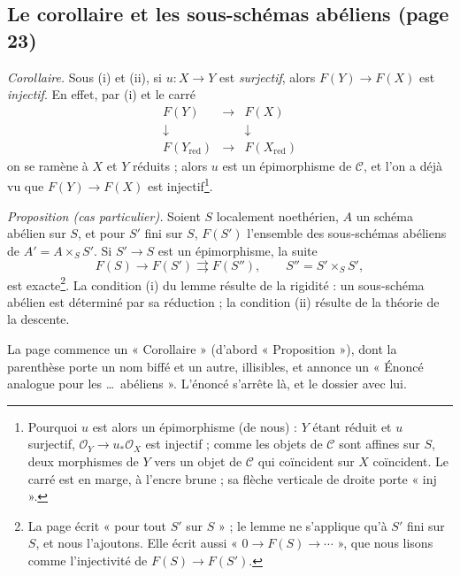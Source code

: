 \documentclass[11pt,a4paper]{article}
\begin{document}
\subsection*{Le corollaire et les sous-schémas abéliens (page 23)}

\emph{Corollaire.} Sous (i) et (ii), si $u \colon X \to Y$ est
\emph{surjectif}, alors $F(Y) \to F(X)$ est \emph{injectif}. En effet, par (i)
et le carré
\[
  \begin{array}{ccc}
    F(Y) & \longrightarrow & F(X) \\
    \downarrow & & \downarrow \\
    F(Y_{\mathrm{red}}) & \longrightarrow & F(X_{\mathrm{red}})
  \end{array}
\]
on se ramène à $X$ et $Y$ réduits ; alors $u$ est un épimorphisme de
$\mathcal{C}$, et l'on a déjà vu que $F(Y) \to F(X)$ est
injectif\footnote{Pourquoi $u$ est alors un épimorphisme (de nous) : $Y$ étant
réduit et $u$ surjectif, $\mathcal{O}_Y \to u_*\mathcal{O}_X$ est injectif ;
comme les objets de $\mathcal{C}$ sont affines sur $S$, deux morphismes de $Y$
vers un objet de $\mathcal{C}$ qui coïncident sur $X$ coïncident. Le carré est
en marge, à l'encre brune ; sa flèche verticale de droite porte « inj ».}.

\emph{Proposition (cas particulier).} Soient $S$ localement noethérien, $A$ un
schéma abélien sur $S$, et pour $S'$ fini sur $S$, $F(S')$ l'ensemble des
sous-schémas abéliens de $A' = A \times_S S'$. Si $S' \to S$ est un
épimorphisme, la suite
\[
  F(S) \to F(S') \rightrightarrows F(S'') , \qquad S'' = S' \times_S S' ,
\]
est exacte\footnote{La page écrit « pour tout $S'$ sur $S$ » ; le lemme ne s'applique qu'à
$S'$ fini sur $S$, et nous l'ajoutons. Elle écrit aussi
« $0 \to F(S) \to \cdots$ », que nous lisons comme l'injectivité de
$F(S) \to F(S')$.}. La condition (i) du lemme résulte de la rigidité : un
sous-schéma abélien est déterminé par sa réduction ; la condition (ii) résulte
de la théorie de la descente.

La page commence un « Corollaire » (d'abord « Proposition »), dont la
parenthèse porte un nom biffé et un autre, illisibles, et annonce un « Énoncé
analogue pour les \ldots\ abéliens ». L'énoncé s'arrête là, et le dossier
avec lui.
\end{document}
